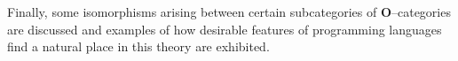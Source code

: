 Finally, some isomorphisms arising between certain subcategories of \(\mathbf{O}\)--categories are discussed and examples of how desirable features of programming languages find a natural place in this theory are exhibited.
%
%
%
%
